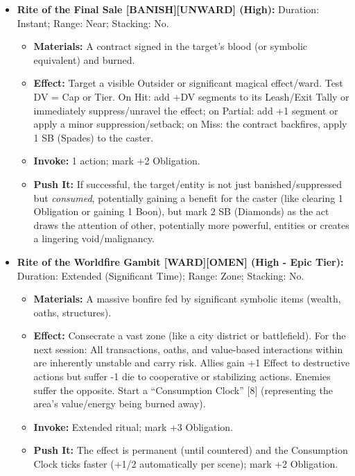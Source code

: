 \begin{itemize}[leftmargin=*]
    \item \textbf{Rite of the Final Sale [BANISH][UNWARD] (High):} Duration: Instant; Range: Near; Stacking: No.
    \begin{itemize}
        \item \textbf{Materials:} A contract signed in the target's blood (or symbolic equivalent) and burned.
        \item \textbf{Effect:} Target a visible Outsider or significant magical effect/ward. Test DV = Cap or Tier. On Hit: add +DV segments to its Leash/Exit Tally or immediately suppress/unravel the effect; on Partial: add +1 segment or apply a minor suppression/setback; on Miss: the contract backfires, apply 1 SB (Spades) to the caster.
        \item \textbf{Invoke:} 1 action; mark +2 Obligation.
        \item \textbf{Push It:} If successful, the target/entity is not just banished/suppressed but \textit{consumed}, potentially gaining a benefit for the caster (like clearing 1 Obligation or gaining 1 Boon), but mark 2 SB (Diamonds) as the act draws the attention of other, potentially more powerful, entities or creates a lingering void/malignancy.
    \end{itemize}
    \item \textbf{Rite of the Worldfire Gambit [WARD][OMEN] (High - Epic Tier):} Duration: Extended (Significant Time); Range: Zone; Stacking: No.
    \begin{itemize}
        \item \textbf{Materials:} A massive bonfire fed by significant symbolic items (wealth, oaths, structures).
        \item \textbf{Effect:} Consecrate a vast zone (like a city district or battlefield). For the next session: All transactions, oaths, and value-based interactions within are inherently unstable and carry risk. Allies gain +1 Effect to destructive actions but suffer -1 die to cooperative or stabilizing actions. Enemies suffer the opposite. Start a ``Consumption Clock'' [8] (representing the area's value/energy being burned away).
        \item \textbf{Invoke:} Extended ritual; mark +3 Obligation.
        \item \textbf{Push It:} The effect is permanent (until countered) and the Consumption Clock ticks faster (+1/2 automatically per scene); mark +2 Obligation.
    \end{itemize}
\end{itemize}


